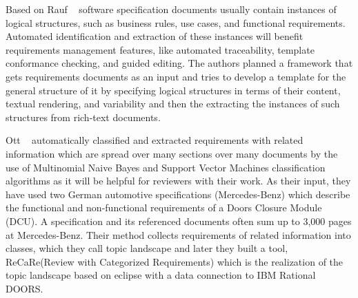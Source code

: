 Based on Rauf \etal~\cite{Rauf:2011} software specification documents usually contain instances of logical structures, such as business rules, use cases, and functional requirements. Automated identification and extraction of these instances will benefit requirements management features, like automated traceability, template conformance checking, and guided editing. The authors planned a framework that gets requirements documents as an input and tries to develop a template for the general structure of it by specifying logical structures in terms of their content, textual rendering, and variability and then the extracting the instances of such structures from rich-text documents. \newline

Ott \etal~\cite{Ott:2013} automatically classified and extracted requirements with related information which are spread over many sections over many documents by the use of Multinomial Naive Bayes and Support Vector Machines classification algorithms as it will be helpful for reviewers with their work. As their input, they have used two German automotive specifications (Mercedes-Benz) which describe the functional and non-functional requirements of a Doors Closure Module (DCU). A specification and its referenced documents often sum up to 3,000 pages at Mercedes-Benz. Their method collects requirements of related information into classes, which they call topic landscape and later they built a tool, ReCaRe(Review with Categorized Requirements) which is the realization of the topic landscape based on eclipse with a data connection to IBM Rational DOORS. 





